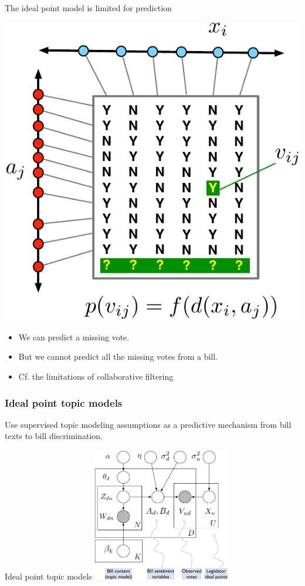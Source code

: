 \documentclass{beamer}
\begin{document}
\begin{frame}{The ideal point model is limited for prediction}
  \begin{center}
    \includegraphics[scale=0.6]{figs/ideal-point-prediction-intuition.pdf}
  \end{center}
  \begin{itemize}
  \item We can predict a missing vote.
  \item But we cannot predict all the missing votes from a bill.
  \item Cf. the limitations of collaborative filtering
  \end{itemize}
\end{frame}

\begin{frame}
  \frametitle{Ideal point topic models}
    Use supervised topic modeling assumptions as a predictive
    mechanism from bill texts to bill discrimination.
\end{frame}

\begin{frame}{Ideal point topic models}
  \includegraphics[width=0.45\textwidth]{figs/ideal-point.pdf}
\end{frame}
\end{document}
